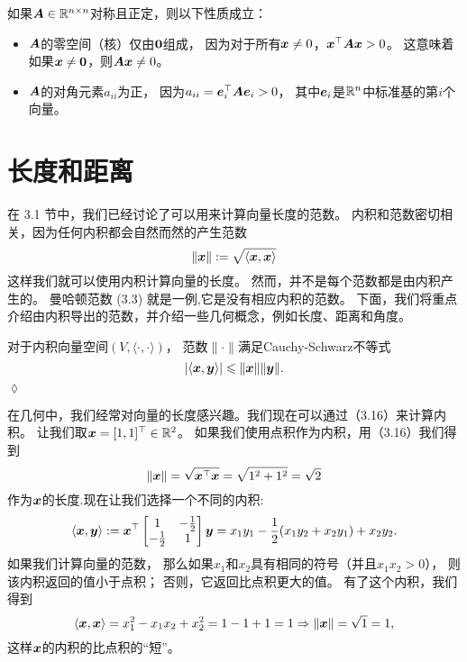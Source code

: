 如果$\boldsymbol{A} \in \mathbb{R}^{n\times n}$对称且正定，则以下性质成立：
\begin{itemize}
    \item $\boldsymbol{A}$的零空间（核）仅由$\boldsymbol{0}$组成，
           因为对于所有$\boldsymbol{x} \neq 0$，$\boldsymbol{x}^\top\boldsymbol{A}\boldsymbol{x} > 0$。
           这意味着如果$\boldsymbol{x} \neq \boldsymbol{0}$，则$\boldsymbol{A}\boldsymbol{x} \neq 0$。
    \item $\boldsymbol{A}$的对角元素$a_{ii}$为正，
          因为$a_{ii} = \boldsymbol{e}_i^\top\boldsymbol{A}\boldsymbol{e}_i > 0$，
          其中$\boldsymbol{e}_i$是$\mathbb{R}^n$中标准基的第$i$个向量。
\end{itemize}

\section{长度和距离}
在 3.1 节中，我们已经讨论了可以用来计算向量长度的范数。
内积和范数密切相关，因为任何内积都会自然而然的产生范数
\begin{equation}
    \|\boldsymbol{x}\| := \sqrt{\langle\boldsymbol{x},\boldsymbol{x}\rangle}
\end{equation}
这样我们就可以使用内积计算向量的长度。
然而，并不是每个范数都是由内积产生的。
曼哈顿范数 (3.3) 就是一例,它是没有相应内积的范数。
下面，我们将重点介绍由内积导出的范数，并介绍一些几何概念，例如长度、距离和角度。
\begin{remark}
    对于内积向量空间$(V, \langle\cdot,\cdot\rangle)$，
    范数$\|\cdot\|$满足Cauchy-Schwarz不等式
    \begin{equation}
        |\langle\boldsymbol{x},\boldsymbol{y}\rangle| \leqslant \|\boldsymbol{x}\|\|\boldsymbol{y}\|.
    \end{equation}
    \hfill $\lozenge$
\end{remark}

\begin{example}[使用内积的向量长度]
    在几何中，我们经常对向量的长度感兴趣。我们现在可以通过（3.16）来计算内积。
    让我们取$\boldsymbol{x} = [1, 1]^\top \in \mathbb{R}^2$。
    如果我们使用点积作为内积，用（3.16）我们得到
    \begin{equation}
        \|\boldsymbol{x}\| = \sqrt{\boldsymbol{x}^\top\boldsymbol{x}} = \sqrt{1^2 + 1^2} = \sqrt{2}
    \end{equation}
    作为$\boldsymbol{x}$的长度.现在让我们选择一个不同的内积:
    \begin{equation}
        \left\langle\boldsymbol{x},\boldsymbol{y}\right\rangle :=
        \boldsymbol{x}^\top
        \begin{bmatrix}
            1 & -\frac{1}{2} \\
            -\frac{1}{2} & 1
        \end{bmatrix}
        \boldsymbol{y} =
        x_1y_1 - \frac{1}{2}(x_1y_2 + x_2y_1) + x_2y_2.
    \end{equation}
    如果我们计算向量的范数，
    那么如果$x_1$和$x_2$具有相同的符号（并且$x_1x_2 > 0$），
    则该内积返回的值小于点积；
    否则，它返回比点积更大的值。
    有了这个内积，我们得到
    \begin{equation}
        \left\langle\boldsymbol{x},\boldsymbol{x}\right\rangle =
        x_1^2 - x_1x_2 + x_2^2 = 1 - 1 + 1 = 1 \Rightarrow \|\boldsymbol{x}\| = \sqrt{1} = 1,
    \end{equation}
    这样$\boldsymbol{x}$的内积的比点积的“短”。
\end{example}

